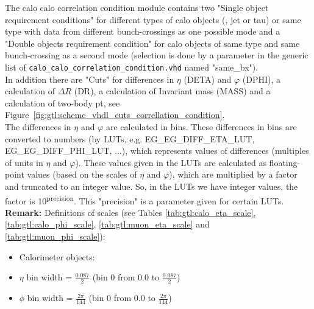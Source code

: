 The calo calo correlation condition module contains two "Single object requirement conditions" for different types of calo objects (\egamma, jet or tau) or same type with data from different bunch-crossings as one possible mode and a "Double objects requirement condition" for calo objects of same type and same bunch-crossing as a second mode (selection is done by a parameter in the generic list of \texttt{calo\_calo\_correlation\_condition.vhd} named "same\_bx").\\
In addition there are "Cuts" for differences in $\eta$ (DETA) and $\varphi$ (DPHI), a calculation of $\Delta$$R$ (DR), a calculation of Invariant mass (MASS) and a calculation of two-body pt, see Figure~\ref{fig:gtl:scheme_vhdl_cuts_correllation_condition}.\\
The differences in $\eta$ and $\varphi$ are calculated in bins. These differences in bins are converted to numbers (by LUTs, e.g. \small{EG\_EG\_DIFF\_ETA\_LUT, EG\_EG\_DIFF\_PHI\_LUT}\normalsize, ...), which represents values of differences (multiples of units in $\eta$ and $\varphi$).
These values given in the LUTs are calculated as floating-point values (based on the scales of $\eta$ and $\varphi$), which are multiplied by a factor and truncated to an integer value.
So, in the LUTs we have integer values, the factor is 10\textsuperscript{\tiny{precision}\normalsize}. This "precision" is a parameter given for certain LUTs.\\

\textbf{Remark:} Definitions of scales (see Tables \ref{tab:gtl:calo_eta_scale}, \ref{tab:gtl:calo_phi_scale}, \ref{tab:gtl:muon_eta_scale} and \ref{tab:gtl:muon_phi_scale}):
\begin{itemize}
\item Calorimeter objects:
\item $\eta$ bin width = $\frac{0.087}{2}$ (bin 0 from 0.0 to $\frac{0.087}{2}$)
\item $\phi$ bin width = $\frac{2\pi}{144}$ (bin 0 from 0.0 to $\frac{2\pi}{144}$)
\end{itemize}

